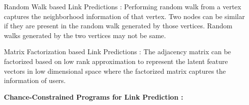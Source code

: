 Random Walk based Link Predictions : Performing random walk from a vertex captures the neighborhood information of that vertex. Two nodes can be similar if they are present in the random walk generated by those vertices. Random walks generated by the two vertices may not be same. 

Matrix Factorization based Link Predictions : The adjacency matrix can be factorized based on low rank approximation to represent the latent feature vectors in low dimensional space where the factorized matrix captures the information of users.

\begin{table}[ht!]
\begin{center}
\end{center}
\caption{Proximity based Link Prediction methods}
\label{table:3}
\end{table}

\begin{flushleft}
\textbf{Chance-Constrained Programs for Link Prediction \cite{socp} :}
\end{flushleft}

